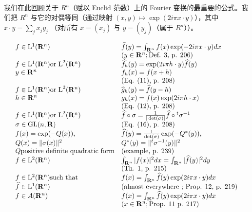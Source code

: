 
我们在此回顾关于 \(R^{n}\)（赋以 Euclid 范数）上的 Fourier 变换的最重要的公式。我们把 \(R^{n}\) 与它的对偶等同（通过映射 \((x,y)\mapsto\exp(2i\pi x\cdot y)\)），其中 \(x\cdot y=\sum_{j}x_{j}y_{j}\) （对所有 \(x=(x_{j})\) 与 \(y=(y_{j})\)（属于 \(R^{n}\)））。

\[
\begin{array}{l l} f \in \mathrm{L} ^ {1} (\mathbf {R} ^ {n}) & \widehat {f} (y) = \int_ {\mathbf {R} ^ {n}} f (x) \exp (- 2 i \pi x \cdot y) d x \\ & (y \in \mathbf {R} ^ {n}; \text {Def. 3, p. 206}) \\ f \in \mathrm{L} ^ {1} (\mathbf {R} ^ {n}) \text {or L} ^ {2} (\mathbf {R} ^ {n}) & \widehat {f} _ {h} (y) = \exp (2 i \pi h \cdot y) \widehat {f} (y) \\ y \in \mathbf {R} ^ {n} & f _ {h} (x) = f (x + h) \\ & (\text {Eq. (11), p. 208}) \\ f \in \mathrm{L} ^ {1} (\mathbf {R} ^ {n}) \text {or L} ^ {2} (\mathbf {R} ^ {n}) & \widehat {g} _ {h} (y) = \widehat {f} (y - h) \\ h \in \mathbf {R} ^ {n} & g _ {h} (x) = f (x) \exp (2 i \pi h \cdot x) \\ & (\text {Eq. (12), p. 208}) \\ f \in \mathrm{L} ^ {1} (\mathbf {R} ^ {n}) \text {or L} ^ {2} (\mathbf {R} ^ {n}) & \widehat {f} \circ \sigma = \frac {1}{| \det (\sigma) |} \widehat {f} \circ {} ^ {t} \sigma^ {- 1} \\ \sigma \in \mathrm{GL} (n, \mathbf {R}) & (\text {Eq. (16), p. 208}) \\ f (x) = \exp (- Q (x)), & \widehat {f} (y) = \frac {1}{\det (\sigma)} \exp (- Q ^ {*} (y)), \\ Q (x) = \| \sigma (x) \| ^ {2} & Q ^ {*} (y) = \| ^ {t} \sigma^ {- 1} (y) \| ^ {2} \\ Q \text {positive definite quadratic form} & (\text {example, p. 239}) \\ f \in \mathrm{L} ^ {2} (\mathbf {R} ^ {n}) & \int_ {\mathbf {R} ^ {n}} | f (x) | ^ {2} d x = \int_ {\mathbf {R} ^ {n}} | \widehat {f} (y) | ^ {2} d y \\ & (\text {Th. 1, p. 215}) \\ f \in \mathrm{L} ^ {2} (\mathbf {R} ^ {n}) \text {such that} & f (x) = \int_ {\mathbf {R} ^ {n}} \widehat {f} (y) \exp (2 i \pi x \cdot y) d x \\ \widehat {f} \in \mathrm{L} ^ {1} (\mathbf {R} ^ {n}) & (\text {almost everywhere ; Prop. 12, p. 219}) \\ f \in A (\mathbf {R} ^ {n}) & f (x) = \int_ {\mathbf {R} ^ {n}} \widehat {f} (y) \exp (2 i \pi x \cdot y) d x \\ & (x \in \mathbf {R} ^ {n}; \text {Prop. 11 p. 217}) \end{array}
\]

